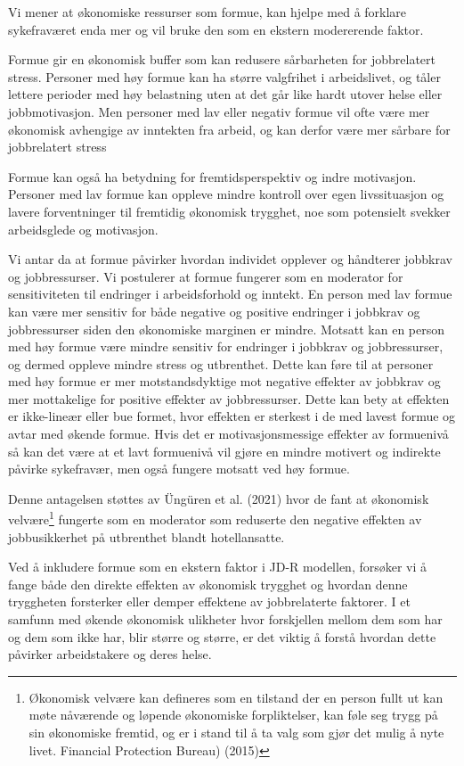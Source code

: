 \documentclass[
  12pt,
  a4paper,
  DIV=11,
  numbers=noendperiod]{scrartcl}
\begin{document}
Vi mener at økonomiske ressurser som formue, kan hjelpe med å forklare
sykefraværet enda mer og vil bruke den som en ekstern modererende
faktor.

Formue gir en økonomisk buffer som kan redusere sårbarheten for
jobbrelatert stress. Personer med høy formue kan ha større valgfrihet i
arbeidslivet, og tåler lettere perioder med høy belastning uten at det
går like hardt utover helse eller jobbmotivasjon. Men personer med lav
eller negativ formue vil ofte være mer økonomisk avhengige av inntekten
fra arbeid, og kan derfor være mer sårbare for jobbrelatert stress

Formue kan også ha betydning for fremtidsperspektiv og indre motivasjon.
Personer med lav formue kan oppleve mindre kontroll over egen
livssituasjon og lavere forventninger til fremtidig økonomisk trygghet,
noe som potensielt svekker arbeidsglede og motivasjon.

Vi antar da at formue påvirker hvordan individet opplever og håndterer
jobbkrav og jobbressurser. Vi postulerer at formue fungerer som en
moderator for sensitiviteten til endringer i arbeidsforhold og inntekt.
En person med lav formue kan være mer sensitiv for både negative og
positive endringer i jobbkrav og jobbressurser siden den økonomiske
marginen er mindre. Motsatt kan en person med høy formue være mindre
sensitiv for endringer i jobbkrav og jobbressurser, og dermed oppleve
mindre stress og utbrenthet. Dette kan føre til at personer med høy
formue er mer motstandsdyktige mot negative effekter av jobbkrav og mer
mottakelige for positive effekter av jobbressurser. Dette kan bety at
effekten er ikke-lineær eller bue formet, hvor effekten er sterkest i de
med lavest formue og avtar med økende formue. Hvis det er
motivasjonsmessige effekter av formuenivå så kan det være at et lavt
formuenivå vil gjøre en mindre motivert og indirekte påvirke sykefravær,
men også fungere motsatt ved høy formue.

Denne antagelsen støttes av Üngüren et al. (2021) hvor de fant at
økonomisk velvære\footnote{Økonomisk velvære kan defineres som en
  tilstand der en person fullt ut kan møte nåværende og løpende
  økonomiske forpliktelser, kan føle seg trygg på sin økonomiske
  fremtid, og er i stand til å ta valg som gjør det mulig å nyte livet.
  Financial Protection Bureau) (2015)} fungerte som en moderator som
reduserte den negative effekten av jobbusikkerhet på utbrenthet blandt
hotellansatte.

Ved å inkludere formue som en ekstern faktor i JD-R modellen, forsøker
vi å fange både den direkte effekten av økonomisk trygghet og hvordan
denne tryggheten forsterker eller demper effektene av jobbrelaterte
faktorer. I et samfunn med økende økonomisk ulikheter hvor forskjellen
mellom dem som har og dem som ikke har, blir større og større, er det
viktig å forstå hvordan dette påvirker arbeidstakere og deres helse.
\end{document}
